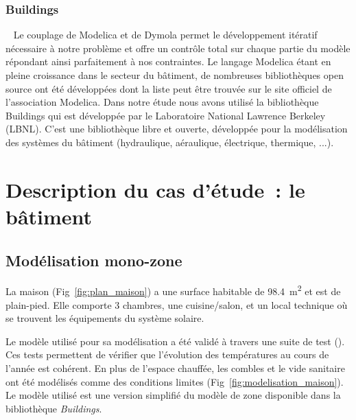 \subsubsection{Buildings} %
\label{ssub:buildings}
~
Le couplage de Modelica et de Dymola permet le développement itératif nécessaire à notre
problème et offre un contrôle total sur chaque partie du modèle répondant ainsi
parfaitement à nos contraintes. Le langage Modelica étant en pleine croissance dans le
secteur du bâtiment, de nombreuses bibliothèques open source ont été développées dont la
liste peut être trouvée sur le site officiel de l’association Modelica. Dans notre étude
nous avons utilisé la bibliothèque Buildings qui est développée par le Laboratoire
National Lawrence Berkeley (LBNL). C’est une bibliothèque libre et ouverte, développée
pour la modélisation des systèmes du bâtiment (hydraulique, aéraulique, électrique,
thermique, ...).




\section{Description du cas d’étude~: le bâtiment} %
\label{sec:description_du_cas_d_etude_le_batiment}
\subsection{Modélisation mono-zone} %
\label{sub:modelisation_monozone}
La maison (Fig~\ref{fig:plan_maison}) a une surface habitable de \SI{98.4}{\meter\squared}
et est de plain-pied.
Elle comporte 3 chambres, une cuisine/salon, et un local technique où se
trouvent les équipements du système solaire.

Le modèle utilisé pour sa modélisation a été validé à travers une suite de test ().
Ces tests permettent de vérifier que l’évolution des températures au cours de l’année est cohérent.
En plus de l’espace chauffée, les combles et le vide sanitaire ont été modélisés
comme des conditions limites (Fig~\ref{fig:modelisation_maison}). Le modèle utilisé est une version
simplifié du modèle de zone disponible dans la bibliothèque \textit{Buildings}.


